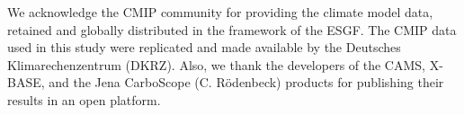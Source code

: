 \documentclass[ProofPDF]{./Styles/Jnls-Template-V3}
\begin{document}








\begin{acknowledgements}[Acknowledgements]
We acknowledge the CMIP community for providing the climate model data, retained and globally distributed in the framework of the ESGF. The CMIP data used in this study were replicated and made available by the Deutsches Klimarechenzentrum (DKRZ). Also, we thank the developers of the CAMS, X-BASE, and the Jena CarboScope (C. Rödenbeck) products for publishing their results in an open platform.

\end{acknowledgements}

\appendix
\end{document}
